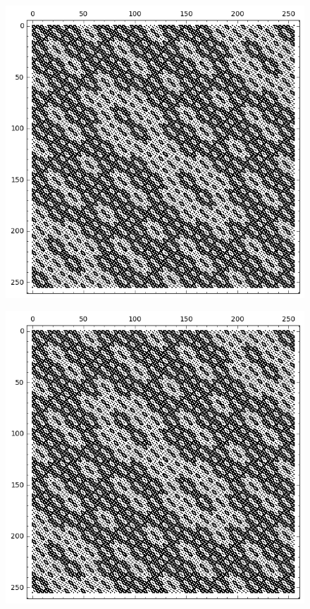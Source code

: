 \documentclass[12pt,a4paper]{article}
\begin{document}
\begin{figure}[!bhpt] %
\centering
\begin{minipage}{.48\textwidth}
  \centering
  \includegraphics[width=.9\linewidth]{../matrix_plot/re8_1_weight_class_matrix.png}
  \label{fig:8_1_weight_class_matrix}
\end{minipage}%
\begin{minipage}{.48\textwidth}
  \centering
  \includegraphics[width=.9\linewidth]{../matrix_plot/re8_1_bent_cayley_graph_index_matrix.png}
  \label{fig:8_1_bent_cayley_graph_index_matrix}
\end{minipage}
\end{figure}
\end{document}

